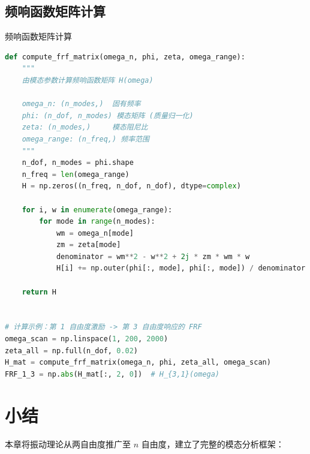 \subsection{频响函数矩阵计算}

\begin{mycode}{频响函数矩阵计算}
\begin{lstlisting}[language=Python]
def compute_frf_matrix(omega_n, phi, zeta, omega_range):
    """
    由模态参数计算频响函数矩阵 H(omega)
    
    omega_n: (n_modes,)  固有频率
    phi: (n_dof, n_modes) 模态矩阵 (质量归一化)
    zeta: (n_modes,)     模态阻尼比
    omega_range: (n_freq,) 频率范围
    """
    n_dof, n_modes = phi.shape
    n_freq = len(omega_range)
    H = np.zeros((n_freq, n_dof, n_dof), dtype=complex)
    
    for i, w in enumerate(omega_range):
        for mode in range(n_modes):
            wm = omega_n[mode]
            zm = zeta[mode]
            denominator = wm**2 - w**2 + 2j * zm * wm * w
            H[i] += np.outer(phi[:, mode], phi[:, mode]) / denominator
    
    return H


# 计算示例：第 1 自由度激励 -> 第 3 自由度响应的 FRF
omega_scan = np.linspace(1, 200, 2000)
zeta_all = np.full(n_dof, 0.02)
H_mat = compute_frf_matrix(omega_n, phi, zeta_all, omega_scan)
FRF_1_3 = np.abs(H_mat[:, 2, 0])  # H_{3,1}(omega)
\end{lstlisting}
\end{mycode}

\section{小结}

本章将振动理论从两自由度推广至 $n$ 自由度，建立了完整的模态分析框架：

